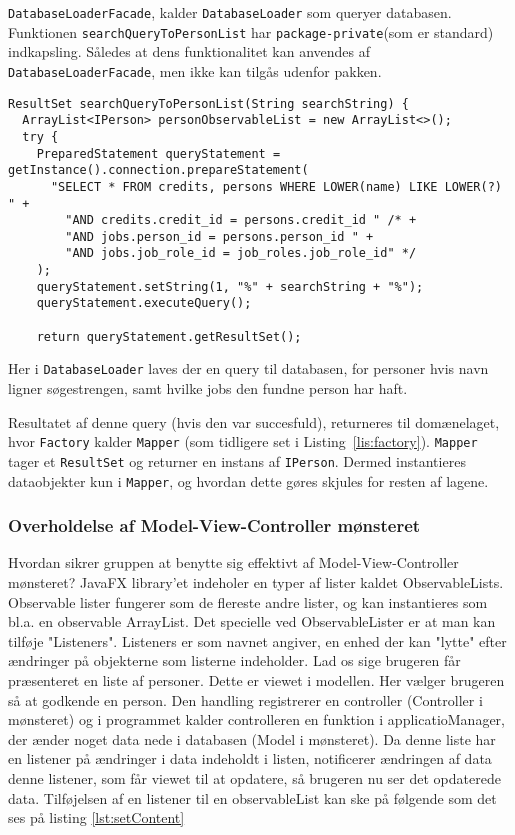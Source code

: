 \texttt{DatabaseLoaderFacade}, kalder \texttt{DatabaseLoader} som queryer
databasen. Funktionen \texttt{searchQueryToPersonList} har
\texttt{package-private}(som er standard) indkapsling. Således at dens
funktionalitet kan anvendes af \texttt{DatabaseLoaderFacade}, men ikke kan
tilgås udenfor pakken. 

\begin{lstlisting}[basicstyle=\ttfamily\footnotesize, firstnumber=42,
caption=Query af databasen for personer (\texttt{DatabaseLoader.java})]
ResultSet searchQueryToPersonList(String searchString) {
  ArrayList<IPerson> personObservableList = new ArrayList<>();
  try {
    PreparedStatement queryStatement = getInstance().connection.prepareStatement(
      "SELECT * FROM credits, persons WHERE LOWER(name) LIKE LOWER(?) " +
        "AND credits.credit_id = persons.credit_id " /* +
        "AND jobs.person_id = persons.person_id " +
        "AND jobs.job_role_id = job_roles.job_role_id" */
    );
    queryStatement.setString(1, "%" + searchString + "%");
    queryStatement.executeQuery();

    return queryStatement.getResultSet();
\end{lstlisting}

Her i \texttt{DatabaseLoader} laves der en query til databasen, for personer
hvis navn ligner søgestrengen, samt hvilke jobs den fundne person har haft.

Resultatet af denne query (hvis den var succesfuld), returneres til domænelaget,
hvor \texttt{Factory} kalder \texttt{Mapper} (som tidligere set i
Listing~\ref{lis:factory}). \texttt{Mapper} tager et \texttt{ResultSet} og
returner en instans af \texttt{IPerson}. Dermed instantieres dataobjekter kun i
\texttt{Mapper}, og hvordan dette gøres skjules for resten af lagene.

\subsubsection{Overholdelse af Model-View-Controller mønsteret} Hvordan sikrer gruppen at benytte sig effektivt af Model-View-Controller mønsteret? 
JavaFX library'et indeholer en typer af lister kaldet ObservableLists.
Observable lister fungerer som de flereste andre lister, og kan instantieres som
bl.a. en observable ArrayList. Det specielle ved ObservableLister er at man kan
tilføje "Listeners". Listeners er som navnet angiver, en enhed der kan "lytte"
efter ændringer på objekterne som listerne indeholder. Lad os sige brugeren får
præsenteret en liste af personer. Dette er viewet i modellen. Her vælger
brugeren så at godkende en person. Den handling registrerer en controller
(Controller i mønsteret) og i programmet kalder controlleren en funktion i
applicatioManager, der ænder noget data nede i databasen (Model i mønsteret). Da
denne liste har en listener på ændringer i data indeholdt i listen, notificerer
ændringen af data denne listener, som får viewet til at opdatere, så brugeren nu
ser det opdaterede data.  Tilføjelsen af en listener til en observableList kan
ske på følgende som det ses på listing \ref{lst:setContent}

